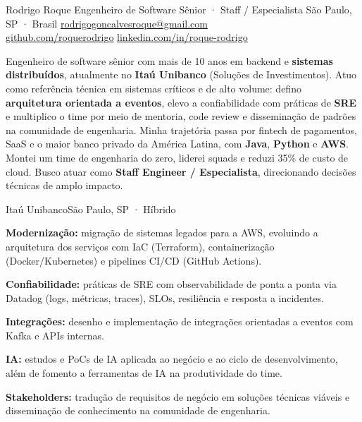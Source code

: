 \documentclass{resume}
\begin{document}
\cvheader
  {Rodrigo Roque}
  {Engenheiro de Software Sênior · Staff / Especialista}
  {São Paulo, SP · Brasil\cvsep
   \href{mailto:rodrigogoncalvesroque@gmail.com}{rodrigogoncalvesroque@gmail.com}\\
   \href{https://github.com/roquerodrigo}{github.com/roquerodrigo}\cvsep
   \href{https://linkedin.com/in/roque-rodrigo}{linkedin.com/in/roque-rodrigo}}


Engenheiro de software sênior com mais de 10 anos em backend e \textbf{sistemas
distribuídos}, atualmente no \textbf{Itaú Unibanco} (Soluções de Investimentos). Atuo
como referência técnica em sistemas críticos e de alto volume: defino \textbf{arquitetura
orientada a eventos}, elevo a confiabilidade com práticas de \textbf{SRE} e multiplico o
time por meio de mentoria, code review e disseminação de padrões na comunidade de
engenharia. Minha trajetória passa por fintech de pagamentos, SaaS e o maior banco
privado da América Latina, com \textbf{Java}, \textbf{Python} e \textbf{AWS}. Montei um
time de engenharia do zero, liderei squads e reduzi 35\% de custo de cloud. Busco atuar
como \textbf{Staff Engineer / Especialista}, direcionando decisões técnicas de amplo impacto.


        {Itaú Unibanco}{São Paulo, SP · Híbrido}
\begin{cvitems}
  \item \textbf{Modernização:} migração de sistemas legados para a AWS, evoluindo a
        arquitetura dos serviços com IaC (Terraform), containerização (Docker/Kubernetes)
        e pipelines CI/CD (GitHub Actions).
  \item \textbf{Confiabilidade:} práticas de SRE com observabilidade de ponta a ponta
        via Datadog (logs, métricas, traces), SLOs, resiliência e resposta a incidentes.
  \item \textbf{Integrações:} desenho e implementação de integrações orientadas a
        eventos com Kafka e APIs internas.
  \item \textbf{IA:} estudos e PoCs de IA aplicada ao negócio e ao ciclo de
        desenvolvimento, além de fomento a ferramentas de IA na produtividade do time.
  \item \textbf{Stakeholders:} tradução de requisitos de negócio em soluções técnicas
        viáveis e disseminação de conhecimento na comunidade de engenharia.
\end{cvitems}
\end{document}
